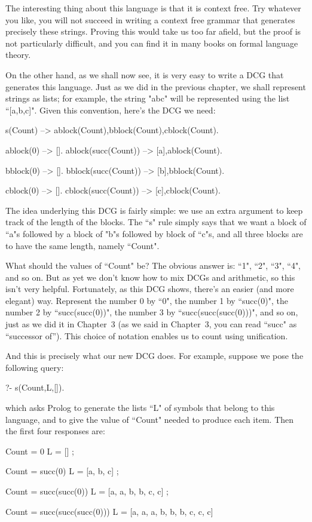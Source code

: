 The interesting thing about this language is that it is 
context free. Try whatever you like, you will not succeed in writing a
context free grammar that generates precisely these strings. Proving
this would take us too far afield, but the proof is not particularly
difficult, and you can find it in many books on formal language
theory.

 On the other hand, as we shall now see, it is very easy to write a
DCG that generates this language. Just as we did in the previous
chapter, we shall represent strings as lists; for example, the string
"abc" will be represented using the list ``[a,b,c]". Given this
convention, here's the DCG we need:
\begin{LPNcodedisplay}
s(Count) --> ablock(Count),bblock(Count),cblock(Count).

ablock(0) --> [].
ablock(succ(Count)) --> [a],ablock(Count).

bblock(0) --> [].
bblock(succ(Count)) --> [b],bblock(Count).

cblock(0) --> [].
cblock(succ(Count)) --> [c],cblock(Count).
\end{LPNcodedisplay}


The idea underlying this DCG is fairly simple: we use an extra
argument to keep track of the length of the blocks. The ``s" rule
simply says that we want a block of ``a"s followed by a block of
"b"s followed by block of ``c"s, and all three blocks are to
have the same length, namely ``Count".

What should the values of ``Count" be? The obvious answer is: ``1", ``2",
``3", ``4", and so on.  But as yet we don't know how to mix DCGs and
arithmetic, so this isn't very helpful. Fortunately, as this DCG
shows, there's an easier (and more elegant) way. Represent the
number 0 by ``0", the number 1 by ``succ(0)", the number 2 by
``succ(succ(0))", the number 3 by ``succ(succ(succ(0)))", and so on,
just as we did it in Chapter~3 (as we said in Chapter~3, you can read
``succ" as ``successor of'').  This choice of notation
enables us to count using unification.

And this is precisely what our new  DCG does.
For example, suppose we pose the following query:
\begin{LPNcodedisplay}
?- s(Count,L,[]).
\end{LPNcodedisplay}
which asks Prolog to generate the lists ``L" of symbols that
belong to this language, and to give the value of ``Count" needed
to produce each item. Then the first four responses are:
\begin{LPNcodedisplay}
Count = 0
L = [] ;

Count = succ(0)
L = [a, b, c] ;

Count = succ(succ(0))
L = [a, a, b, b, c, c] ;

Count = succ(succ(succ(0)))
L = [a, a, a, b, b, b, c, c, c]
\end{LPNcodedisplay}

